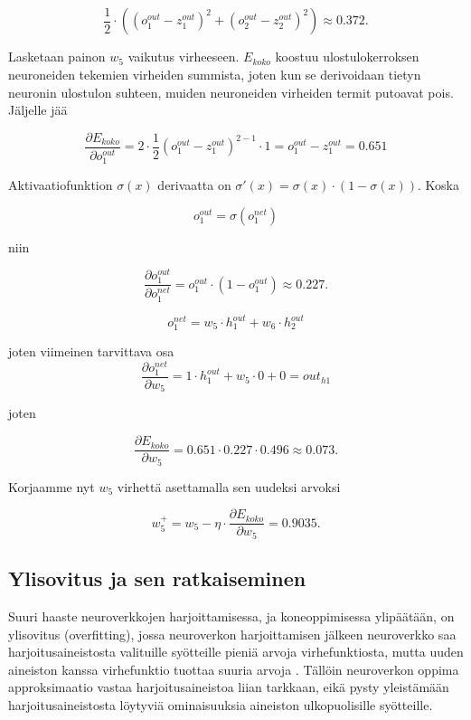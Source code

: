 \documentclass[finnish]{tktltiki2}
\theoremstyle{definition}
\theoremstyle{remark}
\begin{document}
  
  $$ \frac{1}{2} \cdot ( (o_{1}^{out} - z_1^{out})^2 + (o_{2}^{out} - z_2^{out})^2 ) \approx 0.372. $$


  Lasketaan painon $w_5$ vaikutus virheeseen. $E_{koko}$ koostuu ulostulokerroksen neuroneiden tekemien virheiden summista, joten kun se derivoidaan tietyn neuronin ulostulon suhteen, muiden neuroneiden virheiden termit putoavat pois. Jäljelle jää 
  
  $$ \frac{\partial E_{koko}}{\partial o_{1}^{out}} = 2 \cdot \frac{1}{2} (o_{1}^{out} - z_1^{out})^{2-1} \cdot 1 = o_{1}^{out} - z_1^{out} = 0.651$$

  Aktivaatiofunktion $\sigma (x)$ derivaatta on $\sigma'(x) = \sigma(x) \cdot (1 - \sigma(x))$.
  Koska 
  
  $$ o_{1}^{out} = \sigma(o_1^{net}) $$
  
  niin

  $$ \frac{\partial o_{1}^{out}}{\partial o_1^{net}} = o_{1}^{out} \cdot (1 - o_{1}^{out}) \approx 0.227.$$

  $$ o_1^{net} = w_5 \cdot h_{1}^{out} + w_6 \cdot h_{2}^{out} $$
  
  joten viimeinen tarvittava osa 
  $$ \frac{\partial o_1^{net}}{\partial w_5} = 1 \cdot h_{1}^{out} + w_5 \cdot 0 + 0 = out_{h1} $$ 

  joten 
  
  $$\frac{\partial E_{koko}}{\partial w_5} = 0.651 \cdot 0.227 \cdot 0.496 \approx 0.073. $$

   Korjaamme nyt $w_5$ virhettä asettamalla sen uudeksi arvoksi

  $$w_{5}^+ = w_5 - \eta \cdot \frac{\partial E_{koko}}{\partial w_5} = 0.9035.$$





  \subsection{Ylisovitus ja sen ratkaiseminen}

    Suuri haaste neuroverkkojen harjoittamisessa, ja koneoppimisessa ylipäätään, on ylisovitus (overfitting), jossa neuroverkon harjoittamisen jälkeen neuroverkko saa harjoitusaineistosta valituille syötteille pieniä arvoja virhefunktiosta, mutta uuden aineiston kanssa virhefunktio tuottaa suuria arvoja \cite{Nielsen-neural}. Tällöin neuroverkon oppima approksimaatio vastaa harjoitusaineistoa liian tarkkaan, eikä pysty yleistämään harjoitusaineistosta löytyviä ominaisuuksia aineiston ulkopuolisille syötteille.   
\end{document}

